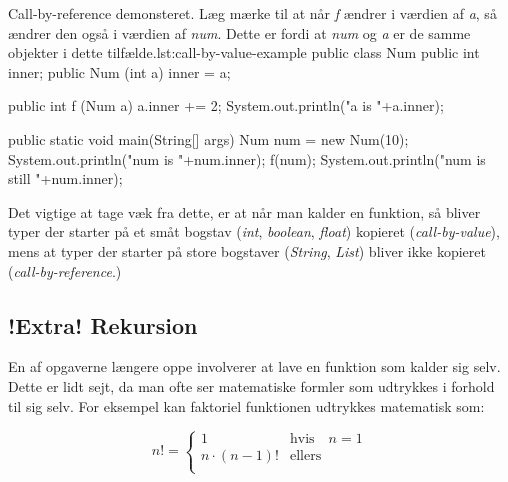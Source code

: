         \begin{JavaCode}{Call-by-reference demonsteret. Læg mærke til at når \emph{f} ændrer i værdien af \emph{a}, så ændrer den også i værdien af \emph{num}. Dette er fordi at \emph{num} og \emph{a} er de samme objekter i dette tilfælde.}{lst:call-by-value-example}
            public class Num {
                public int inner;
                public Num (int a) { inner = a; }
            }

            public int f (Num a) {
                a.inner += 2;
                System.out.println("a is "+a.inner);
            }

            public static void main(String[] args) {
                Num num = new Num(10);
                System.out.println("num is "+num.inner);
                f(num);
                System.out.println("num is still "+num.inner);
            }
        \end{JavaCode}

        Det vigtige at tage væk fra dette, er at når man kalder en
        funktion, så bliver typer der starter på et småt bogstav
        (\emph{int}, \emph{boolean}, \emph{float}) kopieret
        (\emph{call-by-value}), mens at typer der starter på store
        bogstaver (\emph{String}, \emph{List}) bliver ikke kopieret
        (\emph{call-by-reference}.)


	\subsection{!Extra! Rekursion}


        En af opgaverne længere  oppe
        involverer at lave en funktion som kalder sig selv. Dette er
        lidt sejt, da man ofte ser matematiske formler som udtrykkes i
        forhold til sig selv. For eksempel kan faktoriel funktionen
        udtrykkes matematisk som:

        \begin{equation}
            n! = \begin{cases}
                       1 & \text{hvis} \quad n = 1 \\
                       n\cdot(n-1)! & \text{ellers} \\
                  \end{cases}
        \end{equation}

